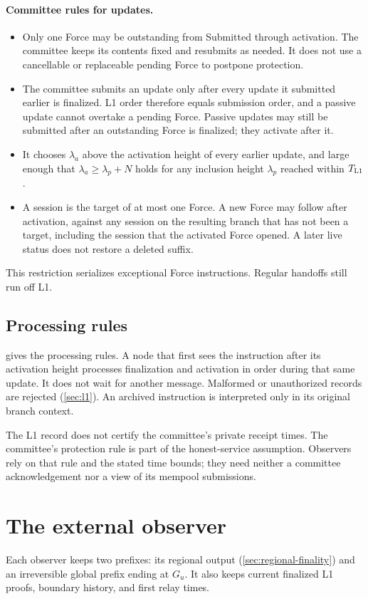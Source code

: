 \documentclass[11pt,a4paper]{article}
\newif\ifrevmarks
\newcommand{\Rv}[1]{\ifrevmarks\leavevmode{\color{rvBlue}#1}\else#1\fi}
\newcommand{\Cid}[1]{\ifrevmarks\textsuperscript{\hyperlink{chg:#1}{\color{rvBlue}\sffamily\scriptsize#1}}\fi}
\begin{document}
\paragraph{\Rv{Committee rules for updates.}}
\begin{itemize}
\item Only one Force may be outstanding from Submitted through activation.
The committee keeps its contents fixed and resubmits as needed. It does
not use a cancellable or replaceable pending Force to postpone protection.
\item \Rv{The committee submits an update only after every update
it submitted earlier is finalized. L1 order therefore equals submission
order, and a passive update cannot overtake a pending Force. Passive
updates may still be submitted after an outstanding Force is finalized;
they activate after it.}
\item \Rv{It chooses $\lambda_a$ above the activation height of every
earlier update, and large enough that $\lambda_a\ge\lambda_p+N$ holds
for any inclusion height $\lambda_p$ reached within $T_{\rm L1}$.}
\item \Rv{A session is the target of at most one Force.} A new
Force may follow after activation, against \Rv{any session on the
resulting branch that has not been a target, including the session that
the activated Force opened.} A later live status does not restore
\Rv{a} deleted suffix.
\end{itemize}
This restriction serializes exceptional Force instructions. Regular
handoffs still run off L1.

\subsection{Processing rules}
\Rv{ gives the processing rules.} A \Rv{node} that first sees the instruction after its activation height
processes finalization and activation in order during that same update.
It does not wait for another message. Malformed or unauthorized records
are rejected \Rv{(\cref{sec:l1})}. An archived
instruction is interpreted only in its original branch context.

The L1 record does not certify the committee's private receipt times.
The committee's protection rule is part of the honest-service assumption.
Observers rely on that rule and the stated time bounds; they need neither
a committee acknowledgement nor a view of its mempool submissions.

\section{The external observer}
\label{sec:observers}
Each observer keeps two prefixes: \Rv{its regional output
(\cref{sec:regional-finality})} and an
irreversible global prefix ending at $G_u$. It also keeps current
finalized L1 proofs, boundary history, and first relay times.
\end{document}

